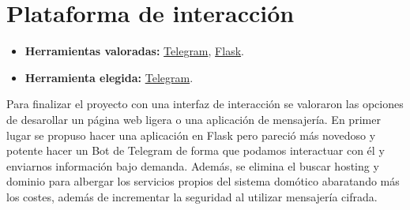 \section{Plataforma de interacción}\label{4:telegram}
\begin{itemize}
    \item \textbf{Herramientas valoradas:} \href{https://telegram.org/}{Telegram}, \href{https://palletsprojects.com/p/flask/}{Flask}.
    \item \textbf{Herramienta elegida:} \href{https://telegram.org/}{Telegram}.
\end{itemize}
Para finalizar el proyecto con una interfaz de interacción se valoraron las opciones de desarollar un página web ligera o una aplicación de mensajería.
En primer lugar se propuso hacer una aplicación en Flask pero pareció más novedoso y potente hacer un Bot de Telegram de forma que podamos interactuar con él y enviarnos información bajo demanda. Además, se elimina el buscar hosting y dominio para albergar los servicios propios del sistema domótico abaratando más los costes, además de incrementar la seguridad al utilizar mensajería cifrada.

